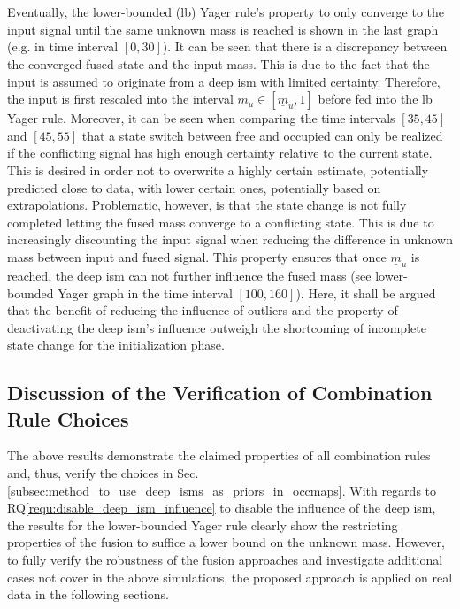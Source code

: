 \\\\
Eventually, the lower-bounded (lb) Yager rule's property to only converge to the input signal until the same unknown mass is reached is shown in the last graph (e.g. in time interval $[0, 30]$). It can be seen that there is a discrepancy between the converged fused state and the input mass. This is due to the fact that the input is assumed to originate from a deep \gls{ism} with limited certainty. Therefore, the input is first rescaled into the interval $m_u \in [\underline{m}_u, 1]$ before fed into the lb Yager rule. Moreover, it can be seen when comparing the time intervals $[35, 45]$ and $[45, 55]$ that a state switch between free and occupied can only be realized if the conflicting signal has high enough certainty relative to the current state. This is desired in order not to overwrite a highly certain estimate, potentially predicted close to data, with lower certain ones, potentially based on extrapolations. Problematic, however, is that the state change is not fully completed letting the fused mass converge to a conflicting state. This is due to increasingly discounting the input signal when reducing the difference in unknown mass between input and fused signal. This property ensures that once $\underline{m}_u$ is reached, the deep \gls{ism} can not further influence the fused mass (see lower-bounded Yager graph in the time interval $[100, 160]$). Here, it shall be argued that the benefit of reducing the influence of outliers and the property of deactivating the deep \gls{ism}'s influence outweigh the shortcoming of incomplete state change for the initialization phase. 
%
\subsection{Discussion of the Verification of Combination Rule Choices}
\label{subsec:discussion_choice_comb_rule}
The above results demonstrate the claimed properties of all combination rules and, thus, verify the choices in Sec. \ref{subsec:method_to_use_deep_isms_as_priors_in_occmaps}. With regards to RQ\ref{requ:disable_deep_ism_influence} to disable the influence of the deep \gls{ism}, the results for the lower-bounded Yager rule clearly show the restricting properties of the fusion to suffice a lower bound on the unknown mass. However, to fully verify the robustness of the fusion approaches and investigate additional cases not cover in the above simulations, the proposed approach is applied on real data in the following sections.
%
